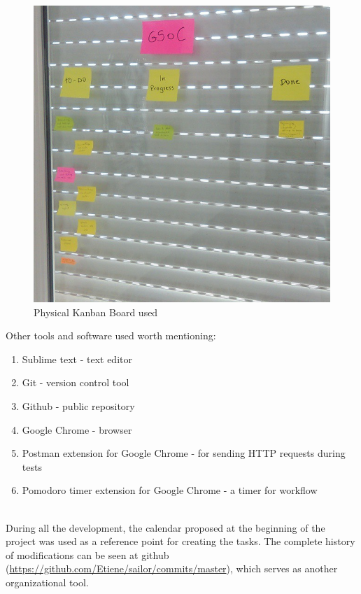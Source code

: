 \documentclass{article}
\begin{document}
\clearpage
\begin{figure}[h]
\centering\includegraphics[scale=0.4]{kanban.jpg}
\caption{\label{fig:kanban} Physical Kanban Board used}
\end{figure}

Other tools and software used worth mentioning: \\

\begin{enumerate}\item Sublime text\autocite{sublime} - text editor
\item Git\autocite{git} - version control tool
\item Github\autocite{github} - public repository
\item Google Chrome - browser
\item Postman extension for Google Chrome\autocite{postman} - for sending HTTP requests during tests
\item Pomodoro timer extension for Google Chrome\autocite{pomodoro} - a timer for workflow
\end{enumerate}\\

During all the development, the calendar proposed at the beginning of the project was used as a reference point for creating the tasks. The complete history of modifications can be seen at github (\url{https://github.com/Etiene/sailor/commits/master}), which serves as another organizational tool.\\
\end{document}
